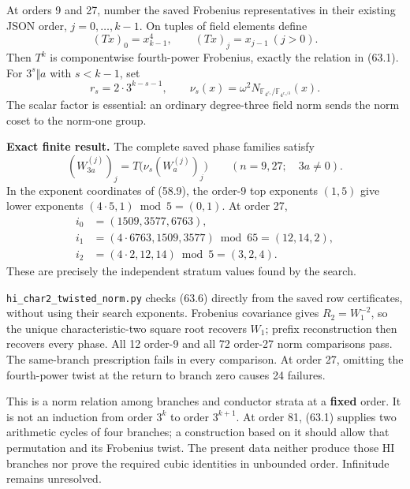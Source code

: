 \documentclass[11pt,reqno]{amsart}
\theoremstyle{plain}
\begin{document}
At orders 9 and 27, number the saved Frobenius representatives in their
existing JSON order, \(j=0,\ldots,k-1\). On tuples of field elements
define
\begin{equation*}
 (Tx)_0=x_{k-1}^4,\qquad (Tx)_j=x_{j-1}\ (j>0).
 \tag{63.4}
\end{equation*}
Then \(T^k\) is componentwise fourth-power Frobenius, exactly the
relation in (63.1). For \(3^s\Vert a\) with \(s<k-1\), set
\begin{equation*}
 r_s=2\cdot3^{k-s-1},\qquad
 \nu_s(x)=\omega^2
 N_{\mathbb F_{4^{r_s}}/\mathbb F_{4^{r_s/3}}}(x).
 \tag{63.5}
\end{equation*}
The scalar factor is essential: an ordinary degree-three field norm
sends the norm coset to the norm-one group.

\textbf{Exact finite result.} The complete saved phase families satisfy
\begin{equation*}
 \boxed{(W_{3a}^{(j)})_j
       =T\bigl(\nu_s(W_a^{(j)})_j\bigr)}
 \qquad(n=9,27;\quad 3a\ne0).
 \tag{63.6}
\end{equation*}
In the exponent coordinates of (58.9), the order-9 top exponents
\((1,5)\) give lower exponents
\((4\cdot5,1)\bmod5=(0,1)\). At order 27,
\begin{equation*}
 \begin{aligned}
 i_0&=(1509,3577,6763),\\
 i_1&=(4\cdot6763,1509,3577)\bmod65=(12,14,2),\\
 i_2&=(4\cdot2,12,14)\bmod5=(3,2,4).
 \end{aligned}
 \tag{63.7}
\end{equation*}
These are precisely the independent stratum values found by the search.

\texttt{hi\_\allowbreak char2\_\allowbreak twisted\_\allowbreak norm.py} checks (63.6) directly from the saved row
certificates, without using their search exponents. Frobenius covariance
gives \(R_2=W_1^{-2}\), so the unique characteristic-two square root
recovers \(W_1\); prefix reconstruction then recovers every phase.
All 12 order-9 and all 72 order-27 norm comparisons pass. The
same-branch prescription fails in every comparison. At order 27,
omitting the fourth-power twist at the return to branch zero causes
24 failures.

This is a norm relation among branches and conductor strata at a
\textbf{fixed} order. It is not an induction from order \(3^k\) to
order \(3^{k+1}\). At order 81, (63.1) supplies two arithmetic cycles
of four branches; a construction based on it should allow that
permutation and its Frobenius twist. The present data neither produce
those HI branches nor prove the required cubic identities in unbounded
order. Infinitude remains unresolved.
\end{document}
